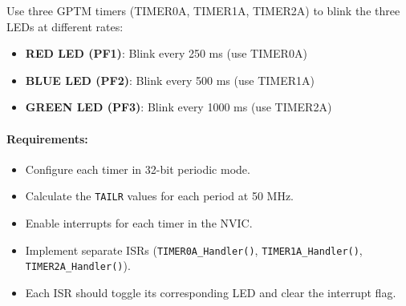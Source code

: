 Use three GPTM timers (TIMER0A, TIMER1A, TIMER2A) to blink the three LEDs at different rates:

\begin{itemize}[nosep]
  \item \textbf{RED LED (PF1)}: Blink every 250 ms (use TIMER0A)
  \item \textbf{BLUE LED (PF2)}: Blink every 500 ms (use TIMER1A)
  \item \textbf{GREEN LED (PF3)}: Blink every 1000 ms (use TIMER2A)
\end{itemize}

\paragraph{Requirements:}
\begin{itemize}[nosep]
  \item Configure each timer in 32-bit periodic mode.
  \item Calculate the \texttt{TAILR} values for each period at 50 MHz.
  \item Enable interrupts for each timer in the NVIC.
  \item Implement separate ISRs (\texttt{TIMER0A\_Handler()}, \texttt{TIMER1A\_Handler()}, \texttt{TIMER2A\_Handler()}).
  \item Each ISR should toggle its corresponding LED and clear the interrupt flag.
\end{itemize}
